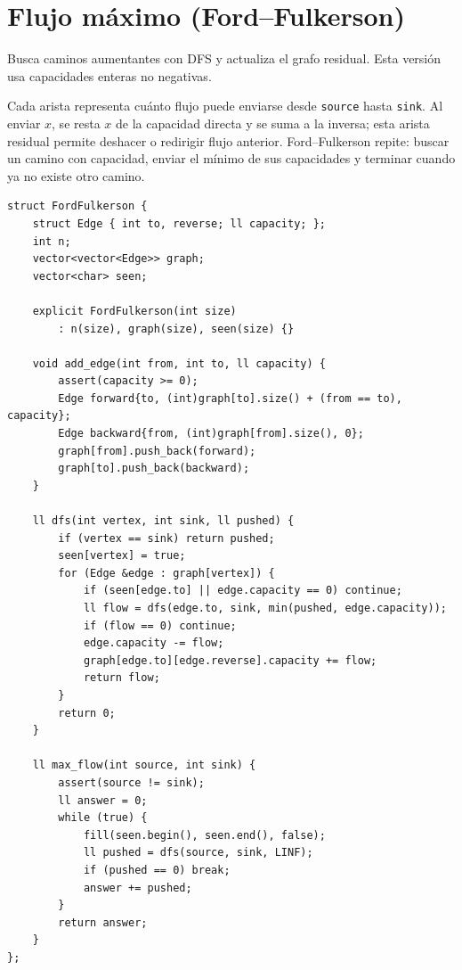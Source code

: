 \section{Flujo m\'aximo (Ford--Fulkerson)}

Busca caminos aumentantes con DFS y actualiza el grafo residual. Esta versi\'on
usa capacidades enteras no negativas.

Cada arista representa cu\'anto flujo puede enviarse desde \texttt{source} hasta
\texttt{sink}. Al enviar $x$, se resta $x$ de la capacidad directa y se suma a
la inversa; esta arista residual permite deshacer o redirigir flujo anterior.
Ford--Fulkerson repite: buscar un camino con capacidad, enviar el m\'inimo de sus
capacidades y terminar cuando ya no existe otro camino.

\begin{lstlisting}[style=cpp]
struct FordFulkerson {
    struct Edge { int to, reverse; ll capacity; };
    int n;
    vector<vector<Edge>> graph;
    vector<char> seen;

    explicit FordFulkerson(int size)
        : n(size), graph(size), seen(size) {}

    void add_edge(int from, int to, ll capacity) {
        assert(capacity >= 0);
        Edge forward{to, (int)graph[to].size() + (from == to), capacity};
        Edge backward{from, (int)graph[from].size(), 0};
        graph[from].push_back(forward);
        graph[to].push_back(backward);
    }

    ll dfs(int vertex, int sink, ll pushed) {
        if (vertex == sink) return pushed;
        seen[vertex] = true;
        for (Edge &edge : graph[vertex]) {
            if (seen[edge.to] || edge.capacity == 0) continue;
            ll flow = dfs(edge.to, sink, min(pushed, edge.capacity));
            if (flow == 0) continue;
            edge.capacity -= flow;
            graph[edge.to][edge.reverse].capacity += flow;
            return flow;
        }
        return 0;
    }

    ll max_flow(int source, int sink) {
        assert(source != sink);
        ll answer = 0;
        while (true) {
            fill(seen.begin(), seen.end(), false);
            ll pushed = dfs(source, sink, LINF);
            if (pushed == 0) break;
            answer += pushed;
        }
        return answer;
    }
};
\end{lstlisting}


